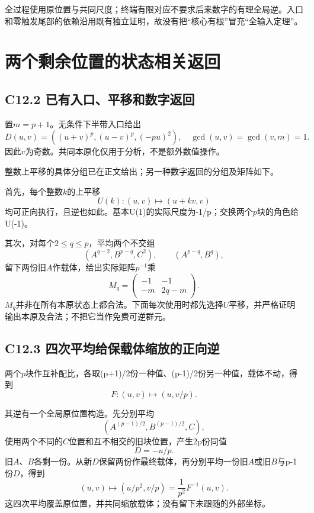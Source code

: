 \documentclass[11pt,a4paper]{article}
\theoremstyle{definition}
\numberwithin{equation}{section}
\begin{document}
{全过程使用原位置与共同尺度；终端有限对应不要求后来数字的有理全局逆。入口和零触发尾部的依赖沿用既有独立证明，故没有把``核心有根''冒充``全输入定理''。}


\section{两个剩余位置的状态相关返回}\label{construct:r-two}
\subsection*{\texorpdfstring{{C12.2} {已有入口、平移和数字返回}}{C12.2 已有入口、平移和数字返回}}\label{C12-h84}

{置\ensuremath{m=p+1}。无条件下半带入口给出} \[
D(u,v)=((u+v)^p,(u-v)^p,(-pu)^2),
\quad \gcd(u,v)=\gcd(v,m)=1.
\tag{C12.2.1}
\] {因此\ensuremath{v}为奇数。共同本原化仅用于分析，不是额外数值操作。}

{整数上平移的具体分组已在正文给出；另一种数字返回的分组及矩阵如下。}

{首先，每个整数\ensuremath{k}的上平移} \[
U(k):(u,v)\longmapsto(u+kv,v)
\tag{C12.2.2}
\] {均可正向执行，且逆也如此。基本U(1)的实际尺度为-1/p；交换两个\ensuremath{p}块的角色给U(-1)。}

{其次，对每个\ensuremath{2\le q\le p}，平均两个不交组} \[
(A^{q-2},B^{p-q},C^2),\qquad
(A^{p-q},B^q),
\] {留下两份旧\ensuremath{A}作载体，给出实际矩阵\ensuremath{p^{-1}}乘} \[
M_q=\begin{pmatrix}-1&-1\\-m&2q-m\end{pmatrix}.
\tag{C12.2.3}
\] {\ensuremath{M_{q}}并非在所有本原状态上都合法。下面每次使用时都先选择\ensuremath{U}平移，并严格证明输出本原及合法；不把它当作免费可逆群元。}

\subsection*{\texorpdfstring{{C12.3} {四次平均给保载体缩放的正向逆}}{C12.3 四次平均给保载体缩放的正向逆}}\label{C12-h85}

{两个\ensuremath{p}块作互补配比，各取(p+1)/2份一种值、(p-1)/2份另一种值，载体不动，得到} \[
F:(u,v)\longmapsto(u,v/p).
\tag{C12.3.1}
\]

{其逆有一个全局原位置构造。先分别平均} \[
(A^{(p-1)/2},B^{(p-1)/2},C),
\] {使用两个不同的\ensuremath{C}位置和互不相交的旧块位置，产生2p份同值} \[
D=-u/p.
\] {旧\ensuremath{A}、\ensuremath{B}各剩一份。从新\ensuremath{D}保留两份作最终载体，再分别平均一份旧\ensuremath{A}或旧\ensuremath{B}与p-1份\ensuremath{D}，得到} \[
(u,v)\longmapsto(u/p^2,v/p)
=\frac1{p^2}F^{-1}(u,v).
\tag{C12.3.2}
\] {这四次平均覆盖原位置，并共同缩放载体；没有留下未跟随的外部坐标。}
\end{document}
